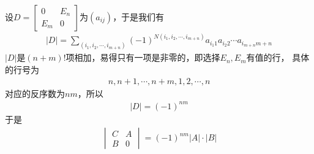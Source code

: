 \documentclass{article}
\begin{document}
\begin{itemize}
        设$D = \begin{bmatrix}
            0   & E_n \\
            E_m & 0
          \end{bmatrix}$为$(a_{ij})$，于是我们有
        \begin{align*}
          |D| = \sum \limits_{(i_1, i_2, \cdots, i_{m+n})}(-1)^{N(i_1, i_2, \cdots, i_{m+n})} a_{i_1 1}a_{i_2 2} \cdots a_{i_{m+n} m+n}
        \end{align*}
        $|D|$是$(n + m)!$项相加，易得只有一项是非零的，即选择$E_n, E_m$有值的行，
        具体的行号为
        \begin{align*}
          n, n+1, \cdots, n+m, 1, 2, \cdots, n
        \end{align*}
        对应的反序数为$nm$，所以
        \begin{align*}
          |D| = (-1)^{nm}
        \end{align*}
        于是
        \begin{align*}
          \begin{vmatrix}
            C & A \\
            B & 0
          \end{vmatrix} = (-1)^{nm} |A| \cdot |B|
        \end{align*}

\end{itemize}
\end{document}
